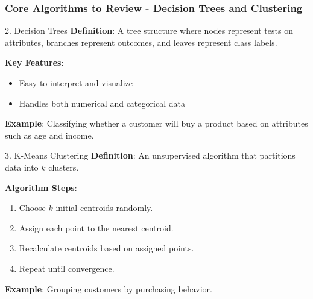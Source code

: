 \documentclass[aspectratio=169]{beamer}
\begin{document}
\begin{frame}[fragile]
    \frametitle{Core Algorithms to Review - Decision Trees and Clustering}
    \begin{block}{2. Decision Trees}
        \textbf{Definition}: A tree structure where nodes represent tests on attributes, branches represent outcomes, and leaves represent class labels.
        
        \textbf{Key Features}:
        \begin{itemize}
            \item Easy to interpret and visualize
            \item Handles both numerical and categorical data
        \end{itemize}
        
        \textbf{Example}: Classifying whether a customer will buy a product based on attributes such as age and income.
    \end{block}
    
    \begin{block}{3. K-Means Clustering}
        \textbf{Definition}: An unsupervised algorithm that partitions data into $k$ clusters.
        
        \textbf{Algorithm Steps}:
        \begin{enumerate}
            \item Choose $k$ initial centroids randomly.
            \item Assign each point to the nearest centroid.
            \item Recalculate centroids based on assigned points.
            \item Repeat until convergence.
        \end{enumerate}
        
        \textbf{Example}: Grouping customers by purchasing behavior.
    \end{block}
\end{frame}
\end{document}
